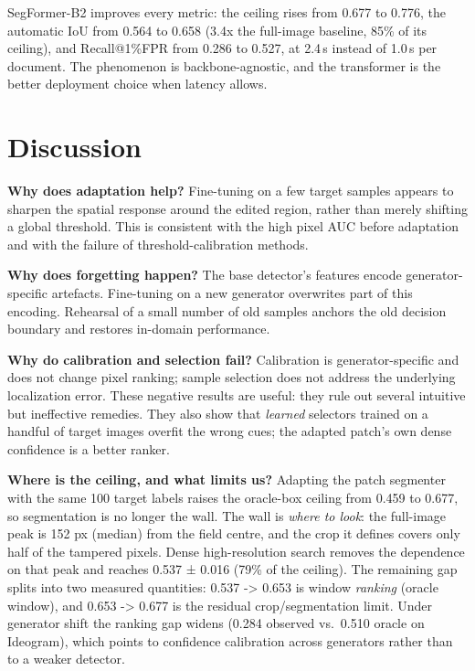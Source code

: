 \documentclass[preprint,12pt]{elsarticle}
\begin{document}
SegFormer-B2 improves every metric: the ceiling rises from 0.677 to 0.776, the automatic IoU from 0.564 to 0.658 (3.4x the full-image baseline, 85\% of its ceiling), and Recall@1\%FPR from 0.286 to 0.527, at 2.4\,s instead of 1.0\,s per document. The phenomenon is backbone-agnostic, and the transformer is the better deployment choice when latency allows.

\section{Discussion}\label{discussion}

\textbf{Why does adaptation help?} Fine-tuning on a few target samples appears to sharpen the spatial response around the edited region, rather than merely shifting a global threshold. This is consistent with the high pixel AUC before adaptation and with the failure of threshold-calibration methods.

\textbf{Why does forgetting happen?} The base detector's features encode generator-specific artefacts. Fine-tuning on a new generator overwrites part of this encoding. Rehearsal of a small number of old samples anchors the old decision boundary and restores in-domain performance.

\textbf{Why do calibration and selection fail?} Calibration is generator-specific and does not change pixel ranking; sample selection does not address the underlying localization error. These negative results are useful: they rule out several intuitive but ineffective remedies. They also show that \emph{learned} selectors trained on a handful of target images overfit the wrong cues; the adapted patch's own dense confidence is a better ranker.

\textbf{Where is the ceiling, and what limits us?} Adapting the patch segmenter with the same 100 target labels raises the oracle-box ceiling from 0.459 to 0.677, so segmentation is no longer the wall. The wall is \emph{where to look}: the full-image peak is 152 px (median) from the field centre, and the crop it defines covers only half of the tampered pixels. Dense high-resolution search removes the dependence on that peak and reaches 0.537 ± 0.016 (79\% of the ceiling). The remaining gap splits into two measured quantities: 0.537 -\textgreater{} 0.653 is window \emph{ranking} (oracle window), and 0.653 -\textgreater{} 0.677 is the residual crop/segmentation limit. Under generator shift the ranking gap widens (0.284 observed vs.~0.510 oracle on Ideogram), which points to confidence calibration across generators rather than to a weaker detector.
\end{document}
